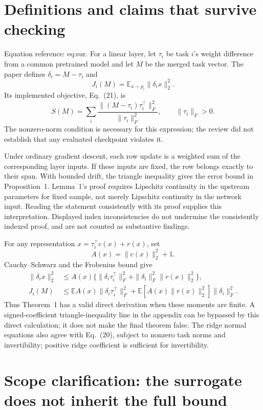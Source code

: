 \documentclass[10pt]{article}
\begin{document}
\section*{Definitions and claims that survive checking}
Equation reference: eq:sur. For a linear layer, let \(\tau_i\) be task \(i\)’s weight difference from a common pretrained model and let \(M\) be the merged task vector. The paper defines \(\delta_i=M-\tau_i\) and \[J_i(M)=\mathbb E_{x\sim p_i}\|\delta_i x\|_2^2 .\] Its implemented objective, Eq. (21), is \[
 S(M)=\sum_i \frac{\|(M-\tau_i)\tau_i^\top\|_F^2}{\|\tau_i\|_F^2},
 \qquad \|\tau_i\|_F>0.\] The nonzero-norm condition is necessary for this expression; the review did not establish that any evaluated checkpoint violates it.\par
Under ordinary gradient descent, each row update is a weighted sum of the corresponding layer inputs. If these inputs are fixed, the row belongs exactly to their span. With bounded drift, the triangle inequality gives the error bound in Proposition 1. Lemma 1’s proof requires Lipschitz continuity in the upstream parameters for fixed sample, not merely Lipschitz continuity in the network input. Reading the statement consistently with its proof supplies this interpretation. Displayed index inconsistencies do not undermine the consistently indexed proof, and are not counted as substantive findings.\par
For any representation \(x=\tau_i^\top c(x)+r(x)\), set \[A(x)=\|c(x)\|_2^2+1.\] Cauchy–Schwarz and the Frobenius bound give \[\begin{aligned}
 \|\delta_i x\|_2^2
 &\le A(x)\{\|\delta_i\tau_i^\top\|_F^2+
                  \|\delta_i\|_F^2\|r(x)\|_2^2\},\\
 J_i(M)&\le \mathbb E A(x)\|\delta_i\tau_i^\top\|_F^2+
          \mathbb E[A(x)\|r(x)\|_2^2]\|\delta_i\|_F^2 .\end{aligned}\] Thus Theorem 1 has a valid direct derivation when these moments are finite. A signed-coefficient triangle-inequality line in the appendix can be bypassed by this direct calculation; it does not make the final theorem false. The ridge normal equations also agree with Eq. (20), subject to nonzero task norms and invertibility; positive ridge coefficient is sufficient for invertibility.\par
\section*{Scope clarification: the surrogate does not inherit the full bound}
\end{document}
